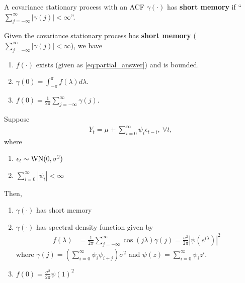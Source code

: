 \documentclass[11pt]{elegantbook}
\begin{document}
\begin{definition}[Short Memory: $\sum_{j=-\infty}^\infty |\gamma(j)|<\infty$]
    A covariance stationary process with an ACF $\gamma(\cdot)$ has \textbf{short memory} if ``$\sum_{j=-\infty}^\infty |\gamma(j)|<\infty$''.
\end{definition}

\begin{corollary}
    Given the covariance stationary process has \textbf{short memory} ($\sum_{j=-\infty}^\infty |\gamma(j)|<\infty$), we have
    \begin{enumerate}
        \item $f(\cdot)$ exists (given as \eqref{eq:partial_answer}) and is bounded.
        \item $\gamma(0)=\int_{-\pi}^\pi f(\lambda) d \lambda$.
        \item $f(0)=\frac{1}{2\pi}\sum_{j=-\infty}^\infty \gamma(j)$.
    \end{enumerate}
\end{corollary}


\begin{example}
    Suppose
    \begin{equation}
        \begin{aligned}
            Y_t=\mu+\sum_{i=0}^\infty \psi_i\epsilon_{t-i},\ \forall t,
        \end{aligned}
        \nonumber
    \end{equation}
    where
    \begin{enumerate}[$\cdot$]
        \item $\epsilon_t\sim \textnormal{WN}(0,\sigma^2)$
        \item $\sum_{i=0}^\infty |\psi_i|<\infty$
    \end{enumerate}
    Then,
    \begin{enumerate}[$\circ$]
        \item $\gamma(\cdot)$ has short memory
        \item $\gamma(\cdot)$ has spectral density function given by
        \begin{equation}
            \begin{aligned}
                f(\lambda)&=\frac{1}{2\pi}\sum_{j=-\infty}^\infty \cos\left(j\lambda\right)\gamma(j)=\frac{\sigma^2}{2\pi}|\psi(e^{i\lambda})|^2
            \end{aligned}
            \nonumber
        \end{equation}
        where $\gamma(j)=(\sum_{i=0}^\infty \psi_i\psi_{i+j})\sigma^2$ and $\psi(z)=\sum_{i=0}^\infty \psi_iz^i$.
        \item $f(0)=\frac{\sigma^2}{2\pi}\psi(1)^2$
    \end{enumerate}
\end{example}
\end{document}
